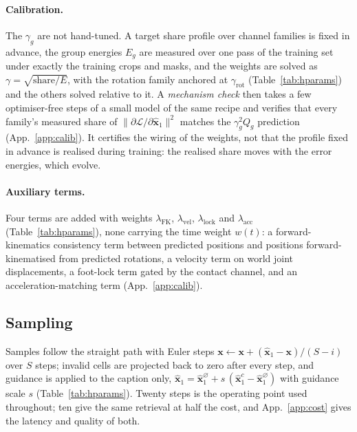 \paragraph{Calibration.} The $\gamma_g$ are not hand-tuned. A target share profile over channel
families is fixed in advance, the group energies $E_g$ are measured over one pass of the training set
under exactly the training crops and masks, and the weights are solved as
$\gamma=\sqrt{\text{share}/E}$, with the rotation family anchored at $\gamma_{\mathrm{rot}}$
(Table~\ref{tab:hparams}) and the others solved relative to it. A \emph{mechanism check} then takes a few
optimiser-free steps of a small model of the same recipe and verifies that every family's measured share of
$\|\partial\mathcal{L}/\partial\hat{\mathbf{x}}_1\|^{2}$ matches the $\gamma_g^{2}Q_g$ prediction
(App.~\ref{app:calib}). It certifies the wiring of the weights, not that the profile fixed in advance is
realised during training: the realised share moves with the error energies, which evolve.

\paragraph{Auxiliary terms.} Four terms are added with weights $\lambda_{\mathrm{FK}}$,
$\lambda_{\mathrm{vel}}$, $\lambda_{\mathrm{lock}}$ and $\lambda_{\mathrm{acc}}$ (Table~\ref{tab:hparams}), none
carrying the time weight $w(t)$: a forward-kinematics consistency term between predicted positions and
positions forward-kinematised from predicted rotations, a velocity term on world joint displacements, a
foot-lock term gated by the contact channel, and an acceleration-matching term (App.~\ref{app:calib}).

\subsection{Sampling}\label{sec:method:sampling}
Samples follow the straight path with Euler steps
$\mathbf{x}\leftarrow\mathbf{x}+(\hat{\mathbf{x}}_1-\mathbf{x})/(S-i)$ over $S$ steps; invalid cells are
projected back to zero after every step, and guidance is applied to the caption only,
$\hat{\mathbf{x}}_1=\hat{\mathbf{x}}_1^{\varnothing}+s\,(\hat{\mathbf{x}}_1^{c}-\hat{\mathbf{x}}_1^{\varnothing})$
with guidance scale $s$ (Table~\ref{tab:hparams}). Twenty steps is the operating point used throughout; ten give the same retrieval at half the
cost, and App.~\ref{app:cost} gives the latency and quality of both.

